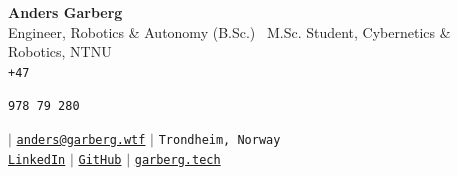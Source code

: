 \documentclass[a4paper,11pt]{article}
\newif\ifcvpublic
\newlength{\cvphonewidth}
\begin{document}
\begin{center}
    \textbf{\Huge Anders Garberg} \\ \vspace{5pt}
    \small
    Engineer, Robotics \& Autonomy (B.Sc.) \textbullet\ M.Sc. Student, Cybernetics \& Robotics, NTNU
    \\ \vspace{7pt}
    \small
    \faPhone* \hspace{2pt} \texttt{+47 }%
    \ifcvpublic
      \settowidth{\cvphonewidth}{\texttt{978 79 280}}\rule[-0.35ex]{\cvphonewidth}{1.5ex}%
    \else
      \texttt{978 79 280}%
    \fi
    \hspace{6pt} $|$ \hspace{6pt}
    \faEnvelope \hspace{2pt} \href{mailto:anders@garberg.wtf}{\texttt{anders@garberg.wtf}} \hspace{6pt} $|$  \hspace{6pt}
    \faMapMarker* \hspace{2pt}\texttt{Trondheim, Norway} \hspace{6pt} \\ \vspace{3pt}
    \faLinkedin \hspace{2pt} \href{https://no.linkedin.com/in/anders-garberg}{\texttt{LinkedIn}} \hspace{6pt} $|$ \hspace{6pt}
    \faGithub \hspace{2pt} \href{https://github.com/andersgar/}{\texttt{GitHub}} \hspace{6pt} $|$ \hspace{6pt}
    \faGlobeEurope \hspace{2pt} \href{https://garberg.tech}{\texttt{garberg.tech}} \hspace{6pt}
\end{center}

\end{document}
